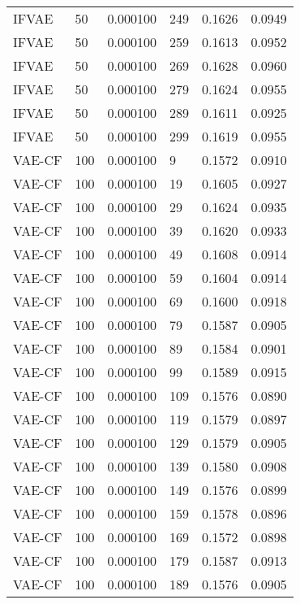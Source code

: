 \begin{tabular}{llrlrr}
   IFVAE &   50 &  0.000100 &   249 &  0.1626 &       0.0949 \\
   IFVAE &   50 &  0.000100 &   259 &  0.1613 &       0.0952 \\
   IFVAE &   50 &  0.000100 &   269 &  0.1628 &       0.0960 \\
   IFVAE &   50 &  0.000100 &   279 &  0.1624 &       0.0955 \\
   IFVAE &   50 &  0.000100 &   289 &  0.1611 &       0.0925 \\
   IFVAE &   50 &  0.000100 &   299 &  0.1619 &       0.0955 \\
  VAE-CF &  100 &  0.000100 &     9 &  0.1572 &       0.0910 \\
  VAE-CF &  100 &  0.000100 &    19 &  0.1605 &       0.0927 \\
  VAE-CF &  100 &  0.000100 &    29 &  0.1624 &       0.0935 \\
  VAE-CF &  100 &  0.000100 &    39 &  0.1620 &       0.0933 \\
  VAE-CF &  100 &  0.000100 &    49 &  0.1608 &       0.0914 \\
  VAE-CF &  100 &  0.000100 &    59 &  0.1604 &       0.0914 \\
  VAE-CF &  100 &  0.000100 &    69 &  0.1600 &       0.0918 \\
  VAE-CF &  100 &  0.000100 &    79 &  0.1587 &       0.0905 \\
  VAE-CF &  100 &  0.000100 &    89 &  0.1584 &       0.0901 \\
  VAE-CF &  100 &  0.000100 &    99 &  0.1589 &       0.0915 \\
  VAE-CF &  100 &  0.000100 &   109 &  0.1576 &       0.0890 \\
  VAE-CF &  100 &  0.000100 &   119 &  0.1579 &       0.0897 \\
  VAE-CF &  100 &  0.000100 &   129 &  0.1579 &       0.0905 \\
  VAE-CF &  100 &  0.000100 &   139 &  0.1580 &       0.0908 \\
  VAE-CF &  100 &  0.000100 &   149 &  0.1576 &       0.0899 \\
  VAE-CF &  100 &  0.000100 &   159 &  0.1578 &       0.0896 \\
  VAE-CF &  100 &  0.000100 &   169 &  0.1572 &       0.0898 \\
  VAE-CF &  100 &  0.000100 &   179 &  0.1587 &       0.0913 \\
  VAE-CF &  100 &  0.000100 &   189 &  0.1576 &       0.0905 \\

\end{tabular}
